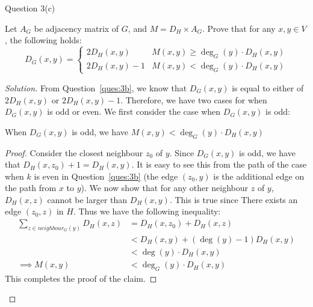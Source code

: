 \begin{solution}{Question 3(c)}\label{ques:3c}
    \begin{question}
        Let $A_G$ be adjacency matrix of $G$, and $M = D_H \times A_G$. Prove that for any $x, y \in V$, the following holds:
        \begin{equation}
          D_G(x, y) = \begin{cases}
            2D_H(x, y) & M(x, y) \geq \deg_G(y) \cdot D_H(x, y)\\
            2D_H(x, y) - 1 & M(x, y) < \deg_G(y) \cdot D_H(x, y)
          \end{cases}
        \end{equation}
    \end{question}
    \tcblower{}
    \begin{proof}[Solution]
      From Question~\ref{ques:3b}, we know that $D_G(x, y)$ is equal to either of $2D_H(x, y)$ or $2D_H(x, y) - 1$. Therefore, we have two cases for when $D_G(x, y)$ is odd or even. We first consider the case when $D_G(x, y)$ is odd:
      \begin{claim}
        When $D_G(x, y)$ is odd, we have $M(x, y) < \deg_G(y) \cdot D_H(x, y)$
      \end{claim}
      \begin{proof}
        Consider the closest neighbour $z_0$ of $y$. Since $D_G(x, y)$ is odd, we have that $D_H(x, z_0) + 1 = D_H(x, y)$. It is easy to see this from the path of the case when $k$ is even in Question~\ref{ques:3b} (the edge $(z_0, y)$ is the additional edge on the path from $x$ to $y$). We now show that for any other neighbour $z$ of $y$, $D_H(x, z)$ cannot be larger than $D_H(x, y)$. This is true since There exists an edge $(z_0, z)$ in $H$. Thus we have the following inequality:
        \begin{equation}
          \begin{split}
            \sum_{z\in neighbour_G(y)} D_H(x, z) &= D_H(x, z_0) + D_H(x, z)\\
                                                 &< D_H(x, y) + (\deg(y)-1)D_H(x, y)\\
                                                 &< \deg(y)\cdot D_H(x, y)\\
                                \implies M(x, y) &< \deg_G(y) \cdot D_H(x, y)
          \end{split}
        \end{equation}
        This completes the proof of the claim.
      \end{proof}

\end{proof}
\end{solution}
